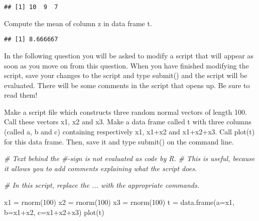 \documentclass[
]{article}
\newenvironment{Shaded}{\begin{snugshade}}{\end{snugshade}}
\newcommand{\AttributeTok}[1]{\textcolor[rgb]{0.77,0.63,0.00}{#1}}
\newcommand{\CommentTok}[1]{\textcolor[rgb]{0.56,0.35,0.01}{\textit{#1}}}
\newcommand{\DecValTok}[1]{\textcolor[rgb]{0.00,0.00,0.81}{#1}}
\newcommand{\FunctionTok}[1]{\textcolor[rgb]{0.00,0.00,0.00}{#1}}
\newcommand{\NormalTok}[1]{#1}
\newcommand{\OtherTok}[1]{\textcolor[rgb]{0.56,0.35,0.01}{#1}}
\newcommand{\SpecialCharTok}[1]{\textcolor[rgb]{0.00,0.00,0.00}{#1}}
\begin{document}
\begin{verbatim}
## [1] 10  9  7
\end{verbatim}

Compute the mean of column z in data frame t.

\begin{Shaded}
\end{Shaded}

\begin{verbatim}
## [1] 8.666667
\end{verbatim}

In the following question you will be asked to modify a script that will
appear as soon as you move on from this question. When you have finished
modifying the script, save your changes to the script and type submit()
and the script will be evaluated. There will be some comments in the
script that opens up. Be sure to read them!

Make a script file which constructs three random normal vectors of
length 100. Call these vectors x1, x2 and x3. Make a data frame called t
with three columns (called a, b and c) containing respectively x1, x1+x2
and x1+x2+x3. Call plot(t) for this data frame. Then, save it and type
submit() on the command line.

\begin{Shaded}
\begin{Highlighting}[]
\CommentTok{\# Text behind the \#{-}sign is not evaluated as code by R. }
\CommentTok{\# This is useful, because it allows you to add comments explaining what the script does.}

\CommentTok{\# In this script, replace the ... with the appropriate commands.}

\NormalTok{x1 }\OtherTok{=} \FunctionTok{rnorm}\NormalTok{(}\DecValTok{100}\NormalTok{)}
\NormalTok{x2 }\OtherTok{=} \FunctionTok{rnorm}\NormalTok{(}\DecValTok{100}\NormalTok{)}
\NormalTok{x3 }\OtherTok{=} \FunctionTok{rnorm}\NormalTok{(}\DecValTok{100}\NormalTok{)}
\NormalTok{t }\OtherTok{=} \FunctionTok{data.frame}\NormalTok{(}\AttributeTok{a=}\NormalTok{x1, }\AttributeTok{b=}\NormalTok{x1}\SpecialCharTok{+}\NormalTok{x2, }\AttributeTok{c=}\NormalTok{x1}\SpecialCharTok{+}\NormalTok{x2}\SpecialCharTok{+}\NormalTok{x3)}
\FunctionTok{plot}\NormalTok{(t)}
\end{Highlighting}
\end{Shaded}
\end{document}
